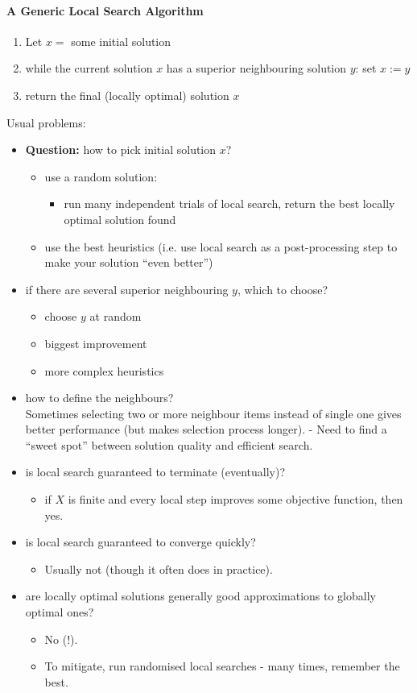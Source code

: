 \documentclass{scrartcl}
\begin{document}
\paragraph{A Generic Local Search Algorithm}
\begin{enumerate}
\item Let $x = $ some initial solution
\item while the current solution $x$ has a superior neighbouring solution $y$:
  set $x := y$
\item return the final (locally optimal) solution $x$
\end{enumerate}
Usual problems:
\begin{itemize}
\item  {\bf Question: } how to pick initial solution $x$?
  \begin{itemize}
  \item use a random solution:
    \begin{itemize}
    \item run many independent trials of local search, return the best locally optimal solution found
    \end{itemize} \item use the best heuristics (i.e. use local search as a post-processing step to make your solution ``even better'')
  \end{itemize}
\item if there are several superior neighbouring $y$, which to choose?
  \begin{itemize}
  \item choose $y$ at random
  \item biggest improvement
  \item more complex heuristics
  \end{itemize}
\item how to define the neighbours?\\
Sometimes selecting two or more neighbour items instead of single one gives better performance (but makes selection process longer). - Need to find a ``sweet spot'' between solution quality and efficient search.
\item is local search guaranteed to terminate (eventually)?
  \begin{itemize}
  \item if $X$ is finite and every local step improves some objective function, then yes.
  \end{itemize}
\item is local search guaranteed to converge quickly?
  \begin{itemize}
  \item Usually not (though it often does in practice).
  \end{itemize}
\item are locally optimal solutions generally good approximations to globally optimal ones?
  \begin{itemize}
  \item No (!). 
  \item To mitigate, run randomised local searches - many times, remember the best.
  \end{itemize}
\end{itemize}
\end{document}
